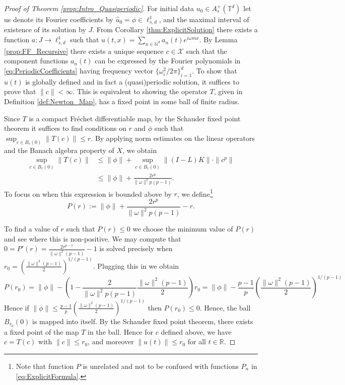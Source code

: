 \documentclass{article}
\newcommand{\R}{\mathbb{R}}
\newcommand{\N}{\mathbb{N}}
\newcommand{\T}{\mathbb{T}}
\newcommand{\cX}{\mathcal{X}}
\begin{document}
\begin{proof}[Proof of Theorem \ref{prop:Intro_Quasiperiodic}]
	For initial data $ u_0 \in A_s^+(\T^d)$ let us denote its Fourier coefficients by $ \hat{u}_0 = \phi \in \ell_{s,d}^1$, and the maximal interval of existence of its solution by $J$. 
	From Corollary \ref{thm:ExplicitSolution} there exists a function $ a : J \to \ell_{s,d}^1$ such that $ u(t,x) = \sum_{n \in \N^d} a_n(t) e^{i \omega m x}$. 
	By Lemma \ref{prop:FF_Recursive}  there exists a unique sequence $c \in \cX$ such that the component functions $a_n(t)$ can be expressed by the Fourier polynomials in \eqref{eq:PeriodicCoefficients} having frequency vector $ \{ \omega_i^2 / 2 \pi \}_{i=1}^d$. 
	To show that $u(t)$ is globally defined and in fact a (quasi)periodic solution, it suffices to prove that $ \| c \|  < \infty$. 
	This is equivalent to showing the operator $T$, given in Definition \ref{def:Newton_Map}, has a fixed point in some ball of finite radius. 
	
	Since $T$ is a compact Fr\'echet differentiable map, by the Schauder fixed point theorem it suffices to find conditions on $r$ and $\phi$ such that $\sup_{ c \in B_r(0)} \| T(c) \| \leq r$.   
	By applying norm estimates on the linear operators and the Banach algebra property of $X$, we obtain  
	\begin{align*}
	\sup_{ c \in B_r(0)} \| T(c) \| &\leq \| \phi \| + \sup_{ c \in B_r(0)} \|   (I-L)K \|  \cdot \| c^p \| \\
	&\leq \| \phi\| + \frac{2 r^p}{\|\omega\|^2 p(p-1)} .
	\end{align*}
	To focus on when this expression is bounded above by $r$, we define\footnote{Note that function $P$ is unrelated and not to be confused with functions $P_n$ in \eqref{eq:ExplicitFormula}.}  
	\[
	P(r) := \| \phi \| + \frac{2 r^p}{\|\omega\|^2 p(p-1)} -r .
	\]
	
	



To find a value of $r$ such that $P(r)\leq 0$ we choose the minimum value of $P(r)$ and see where this is non-positive. 	
We may compute   that  $0=P'(r) = \frac{2 r^{p-1}}{\|\omega\|^2 (p-1)} -1$ is solved precisely when $ r_0 = \left( \frac{\|\omega\|^2 (p-1)}{2}\right)^{1/(p-1)} $. 
Plugging this in we obtain 
\[
P(r_0) = 
\|\phi\| - \left(
1-\frac{2}{\|\omega\|^2p(p-1)} \frac{\|\omega\|^2(p-1)}{2}
\right) r_0 
=
\|\phi\| - \frac{p-1}{p} \left( \frac{\|\omega\|^2 (p-1)}{2}\right)^{1/(p-1)}
\]
Hence if $\|\phi\| \leq    \frac{p-1}{p} \left( \frac{\|\omega\|^2 (p-1)}{2}\right)^{1/(p-1)}$ then  $P(r_0) \leq 0$.  
Hence, the ball $B_{r_0}(0)$ is mapped into itself. 
By the Schauder fixed point theorem, there exists a fixed point of the map $T$ in the ball. 
Hence for $c$ defined above, we have $ c = T(c)$ with  $ \| c\| \leq r_0$, and moreover $ \|u(t)\| \leq r_0$ for all $ t \in \R$. 

\end{proof}
 
\end{document}
